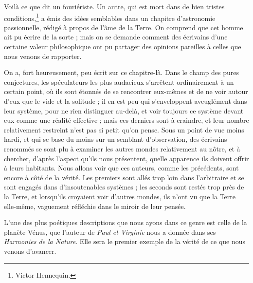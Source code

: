 \documentclass[a4paper, 11pt, oneside]{article}
\begin{document}
Voilà ce que dit un fouriériste. Un autre, qui est mort dans de bien tristes conditions,\footnote{Victor Hennequin.} a émis des idées semblables dans un chapitre d'astronomie passionnelle, rédigé à propos de l'âme de la Terre. On comprend que cet homme ait pu écrire de la sorte ; mais on se demande comment des écrivains d'une certaine valeur philosophique ont pu partager des opinions pareilles à celles que nous venons de rapporter.

On a, fort heureusement, peu écrit sur ce chapitre-là. Dans le champ des pures conjectures, les spéculateurs les plus audacieux s'arrêtent ordinairement à un certain point, où ils sont étonnés de se rencontrer eux-mêmes et de ne voir autour d'eux que le vide et la solitude ; il en est peu qui s'enveloppent aveuglément dans leur système, pour ne rien distinguer au-delà, et voir toujours ce système devant eux comme une réalité effective ; mais ces derniers sont à craindre, et leur nombre relativement restreint n'est pas si petit qu'on pense. Sous un point de vue moins hardi, et qui se base du moins sur un semblant d'observation, des écrivains renommés se sont plu à examiner les autres mondes relativement au nôtre, et à chercher, d'après l'aspect qu'ils nous présentent, quelle apparence ils doivent offrir à leurs habitants. Nous allons voir que ces auteurs, comme les précédents, sont encore à côté de la vérité. Les premiers sont allés trop loin dans l'arbitraire et se sont engagés dans d'insoutenables systèmes ; les seconds sont restés trop près de la Terre, et lorsqu'ils croyaient voir d'autres mondes, ils n'ont vu que la Terre elle-même, vaguement réfléchie dans le miroir de leur pensée.

L'une des plus poétiques descriptions que nous ayons dans ce genre est celle de la planète Vénus, que l'auteur de \emph{Paul et Virginie} nous a donnée dans ses \emph{Harmonies de la Nature}. Elle sera le premier exemple de la vérité de ce que nous venons d'avancer.
\end{document}

